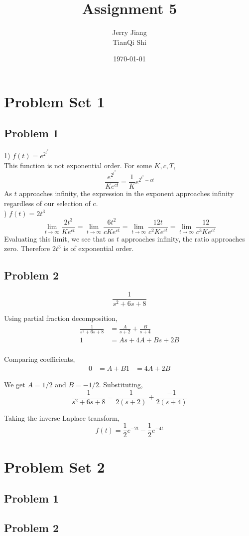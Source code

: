 \documentclass[titlepage]{article}
\title{Assignment 5}
\date{\today}
\author{Jerry Jiang\\ TianQi Shi}
\begin{document}
\maketitle

\noindent
\section{Problem Set 1}
\subsection{Problem 1}
1) $f(t) = e^{2^{t^2}}$ \\
This function is not exponential order. For some $K, c, T$,
$$\frac{e^{2^{t^2}}}{Ke^{ct}} = \frac{1}{K}e^{2^{t^2} - ct}$$
As $t$ approaches infinity, the expression in the exponent approaches infinity regardless of our selection of c.\\

) $f(t) = 2t^3$ \\
$$\lim_{t\to\infty} \frac{2t^3}{Ke^{ct}} = \lim_{t\to\infty} \frac{6t^2}{cKe^{ct}} = \lim_{t\to\infty} \frac{12t}{c^2Ke^{ct}} = \lim_{t\to\infty} \frac{12}{c^3Ke^{ct}}$$
Evaluating this limit, we see that as $t$ approaches infinity, the ratio approaches zero. Therefore $2t^3$ is of exponential order.

\subsection{Problem 2}
$$\frac{1}{s^2 + 6s + 8}$$

Using partial fraction decomposition,
\begin{align*}
  \frac{1}{s^2 + 6s + 8} &= \frac{A}{s+2} + \frac{B}{s+4} \\
  1 &= As + 4A + Bs + 2B \\
\end{align*}

Comparing coefficients,
\begin{align*}
  0 &= A + B
  1 &= 4A + 2B
\end{align*}

We get $A = 1/2$ and $B = -1/2$. Substituting,
$$\frac{1}{s^2 + 6s + 8} = \frac{1}{2(s+2)} + \frac{-1}{2(s+4)}$$

Taking the inverse Laplace transform,
$$f(t) = \frac{1}{2}e^{-2t} - \frac{1}{2}e^{-4t}$$

\section{Problem Set 2}
\subsection{Problem 1}

\subsection{Problem 2}
\end{document}
